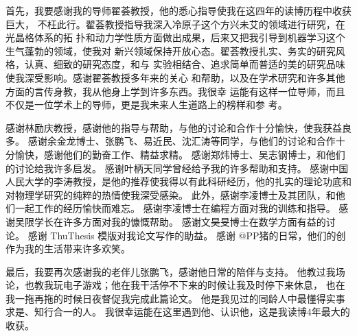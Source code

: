 \begin{acknowledgement}

首先，我要感谢我的导师翟荟教授，他的悉心指导使我在这四年的读博历程中收获巨大，
不枉此行。翟荟教授指导我深入冷原子这个方兴未艾的领域进行研究，在光晶格体系的拓
扑和动力学性质方面做出成果，后来又把我引导到机器学习这个生气蓬勃的领域，使我对
新兴领域保持开放心态。翟荟教授扎实、务实的研究风格，认真、细致的研究态度，和与
实验相结合、追求简单而普适的美的研究品味使我深受影响。感谢翟荟教授多年来的关心
和帮助，以及在学术研究和许多其他方面的言传身教，我从他身上学到许多东西。我很幸
运能有这样一位导师，而且不仅是一位学术上的导师，更是我未来人生道路上的榜样和参
考。

感谢林励庆教授，感谢他的指导与帮助，与他的讨论和合作十分愉快，使我获益良多。
感谢余金龙博士、张鹏飞、易近民、沈汇涛等同学，与他们的讨论和合作十分愉快，感谢他们的勤奋工作、精益求精。
感谢郑炜博士、吴志钢博士，和他们的讨论给我许多启发。
感谢叶柄天同学曾经给予我的许多帮助和支持。
感谢中国人民大学的李涛教授，是他的推荐使我得以有此科研经历，他的扎实的理论功底和对物理学研究的纯粹的热情使我深受感染。
此外，感谢李凌博士及其团队，和他们一起工作的经历愉快而难忘。
感谢李凌博士在编程方面对我的训练和指导。
感谢吴限学长在许多方面对我的慷慨帮助。
感谢文昊旻博士在数学方面有益的讨论。
感谢 ThuThesis 模版对我论文写作的助益。
感谢 @PP猪的日常，他们的创作为我的生活带来许多欢笑。

最后，我要再次感谢我的老伴儿张鹏飞，感谢他日常的陪伴与支持。
他教过我场论，也教我玩电子游戏；他在我干活停不下来的时候让我及时停下来休息，
也在我一拖再拖的时候日夜督促我完成此篇论文。
他是我见过的同龄人中最懂得实事求是、知行合一的人。
我很幸运能在这里遇到他、认识他，这是我读博4年最大的收获。


\end{acknowledgement}
